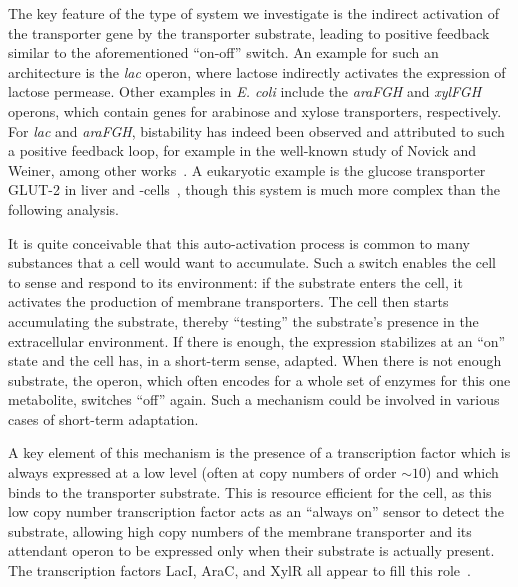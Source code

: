 \documentclass[10pt,letterpaper]{article}
\begin{document}
	The key feature of the type of system we investigate is the indirect activation of
	the transporter gene by the transporter substrate, leading to positive
	feedback similar to the aforementioned ``on-off'' switch. An example for
	such an architecture is the \emph{lac} operon, where lactose indirectly
	activates the expression of lactose permease. Other examples in \emph{E.
		coli} include the \emph{araFGH} and \emph{xylFGH} operons, which contain genes for
	arabinose and xylose transporters, respectively. For \emph{lac} and
	\emph{araFGH}, bistability has indeed been observed and attributed to such a
	positive feedback
	loop, for example in the well-known study of Novick and Weiner,
	among other works~\cite{Novick1957,Santillan2008,Ozbudak2004,Narang2008,Choi2008,Fritz2014,Jenkins2017,Siegele1997}.
	A eukaryotic example is the glucose transporter GLUT-2 in liver and
	\textbeta-cells~\cite{Bae2010,Tiedge1991}, though this system is much more
	complex than the following analysis.
	
	It is quite conceivable that this auto-activation process is common to many
	substances that a cell would want to accumulate. Such a switch enables the
	cell to sense and respond to its environment: if the substrate enters the
	cell, it activates the production of membrane transporters. The cell then
	starts accumulating the substrate, thereby ``testing'' the substrate's
	presence in the extracellular environment. If there is enough, the
	expression stabilizes at an ``on'' state and the cell has, in a short-term
	sense, adapted. When there is not enough substrate, the operon, which
	often encodes for a whole set of enzymes for this one metabolite, switches
	``off'' again. Such a mechanism could be involved in various cases of
	short-term adaptation.
	
	A key element of this mechanism is the presence of a transcription factor
	which is always expressed at a low level (often at copy numbers
	of order $\sim10$) and which binds to the transporter substrate.
	This is resource efficient for the cell, as this low copy number
	transcription factor acts as an ``always on'' sensor to detect
	the substrate, allowing high copy numbers of the membrane transporter
	and its attendant operon to be expressed only when
	their substrate is actually present. The transcription factors
	LacI, AraC, and XylR all appear to fill this
	role~\cite{Novick1957,Santillan2008,Ozbudak2004,Narang2008,Choi2008,Fritz2014,Jenkins2017,Siegele1997,Song1997,Schmidt2015}.
	
\end{document}
